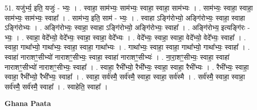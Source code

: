 \documentclass[17pt]{extarticle}
\begin{document}
51. यजु॑र्भ्य॒ इति॒ यजुः॑ - भ्यः॒ । . स्वाहा॒ साम॑भ्यः॒ साम॑भ्यः॒ स्वाहा॒ स्वाहा॒ साम॑भ्यः । . साम॑भ्यः॒ स्वाहा॒ स्वाहा॒ साम॑भ्यः॒ साम॑भ्यः॒ स्वाहा᳚ । . साम॑भ्य॒ इति॒ साम॑ - भ्यः॒ । . स्वाहा ऽङ्गि॑रोभ्यो॒ अङ्गि॑रोभ्यः॒ स्वाहा॒ स्वाहा ऽङ्गि॑रोभ्यः । . अङ्गि॑रोभ्यः॒ स्वाहा॒ स्वाहा ऽङ्गि॑रोभ्यो॒ अङ्गि॑रोभ्यः॒ स्वाहा᳚ । . अङ्गि॑रोभ्य॒ इत्यङ्गि॑रः - भ्यः॒ । . स्वाहा॒ वेदे᳚भ्यो॒ वेदे᳚भ्यः॒ स्वाहा॒ स्वाहा॒ वेदे᳚भ्यः । . वेदे᳚भ्यः॒ स्वाहा॒ स्वाहा॒ वेदे᳚भ्यो॒ वेदे᳚भ्यः॒ स्वाहा᳚ । . स्वाहा॒ गाथा᳚भ्यो॒ गाथा᳚भ्यः॒ स्वाहा॒ स्वाहा॒ गाथा᳚भ्यः । . गाथा᳚भ्यः॒ स्वाहा॒ स्वाहा॒ गाथा᳚भ्यो॒ गाथा᳚भ्यः॒ स्वाहा᳚ । . स्वाहा॑ नाराशꣳ॒॒सीभ्यो॑ नाराशꣳ॒॒सीभ्यः॒ स्वाहा॒ स्वाहा॑ नाराशꣳ॒॒सीभ्यः॑ । . ना॒रा॒शꣳ॒॒सीभ्यः॒ स्वाहा॒ स्वाहा॑ नाराशꣳ॒॒सीभ्यो॑ नाराशꣳ॒॒सीभ्यः॒ स्वाहा᳚ । . स्वाहा॒ रैभी᳚भ्यो॒ रैभी᳚भ्यः॒ स्वाहा॒ स्वाहा॒ रैभी᳚भ्यः । . रैभी᳚भ्यः॒ स्वाहा॒ स्वाहा॒ रैभी᳚भ्यो॒ रैभी᳚भ्यः॒ स्वाहा᳚ । . स्वाहा॒ सर्व॑स्मै॒ सर्व॑स्मै॒ स्वाहा॒ स्वाहा॒ सर्व॑स्मै । . सर्व॑स्मै॒ स्वाहा॒ स्वाहा॒ सर्व॑स्मै॒ सर्व॑स्मै॒ स्वाहा᳚ । . स्वाहेति॒ स्वाहा᳚ । \newline

\textbf{Ghana Paata } \newline
\end{document}
